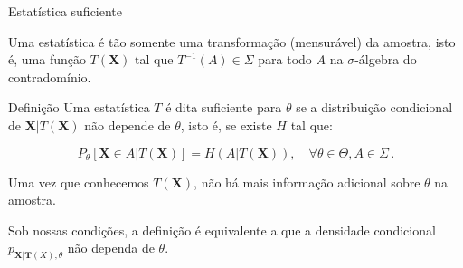 \documentclass[11pt]{beamer}
\newenvironment{halfwideitemize}{\itemize\addtolength{\itemsep}{0.5em}}{\enditemize}
\begin{document}
	
	\begin{frame}{Estatística suficiente}
		\begin{halfwideitemize}
			\item Uma estatística é tão somente uma transformação (mensurável) da amostra, isto é, uma função $T(\boldsymbol{X})$ tal que $T^{-1}(A) \in \Sigma$ para todo $A$ na $\sigma$-álgebra do contradomínio.
			\begin{block}{Definição}
				Uma estatística $T$ é dita suficiente para $\theta$ se a distribuição condicional de $\boldsymbol{X}|T(\boldsymbol{X})$ não depende de $\theta$, isto é, se existe $H$ tal que:
				
				\begin{equation*}
					P_\theta[\boldsymbol{X} \in A|T(\boldsymbol{X})] = H(A|T(\boldsymbol{X})), \quad \forall \theta \in \Theta, A \in \Sigma \, .
				\end{equation*}
				
			\end{block}
			\item Uma vez que conhecemos $T(\boldsymbol{X})$, não há mais informação adicional sobre $\theta$ na amostra.
			\item Sob nossas condições, a definição é equivalente a que a densidade condicional $p_{\boldsymbol{X}|\boldsymbol{T}(X),\theta}$ não dependa de $\theta$.
		\end{halfwideitemize}
		
	\end{frame}
	
\end{document}
